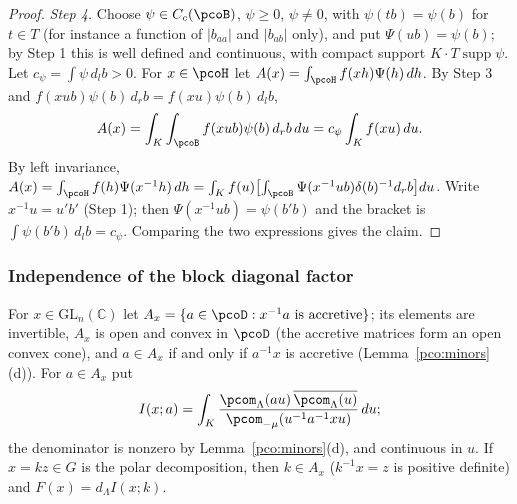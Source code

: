 \documentclass[10pt]{amsart}
\theoremstyle{definition}
\theoremstyle{remark}
\newcommand{\C}{\mathbb C}
\begin{document}
\begin{proof}
\emph{Step 4.} Choose $\psi\in C_c(\pcoB)$, $\psi\ge0$, $\psi\ne0$, with $\psi(tb)=\psi(b)$ for $t\in T$
(for instance a function of $|b_{aa}|$ and $|b_{ab}|$ only), and put $\Psi(ub)=\psi(b)$; by Step 1
this is well defined and continuous, with compact support $K\cdot T\operatorname{supp}\psi$. Let
$c_\psi=\int\psi\,d_lb>0$. For $x\in\pcoH$ let $A(x)=\int_{\pcoH}f(xh)\Psi(h)\,dh$. By Step 3 and
$f(xub)\psi(b)\,d_rb=f(xu)\psi(b)\,d_lb$,
\[
A(x)=\int_K\int_{\pcoB}f(xub)\psi(b)\,d_rb\,du=c_\psi\int_Kf(xu)\,du .
\]
By left invariance, $A(x)=\int_{\pcoH}f(h)\Psi(x^{-1}h)\,dh=\int_Kf(u)\bigl[\int_{\pcoB}\Psi(x^{-1}ub)
\delta(b)^{-1}d_rb\bigr]du$. Write $x^{-1}u=u'b'$ (Step 1); then $\Psi(x^{-1}ub)=\psi(b'b)$ and the
bracket is $\int\psi(b'b)\,d_lb=c_\psi$. Comparing the two expressions gives the claim.
\end{proof}

\subsubsection{Independence of the block diagonal factor}\label{pco:ss-indep}
For $x\in\mathrm{GL}_n(\C)$ let $A_x=\{a\in\pcoD:x^{-1}a\text{ is accretive}\}$; its elements are
invertible, $A_x$ is open and convex in $\pcoD$ (the accretive matrices form an open convex cone),
and $a\in A_x$ if and only if $a^{-1}x$ is accretive (Lemma~\ref{pco:minors}(d)). For $a\in A_x$ put
\begin{equation}\label{pco:eq-I}
I(x;a)=\int_K\frac{\pcom_\Lambda(au)\,\overline{\pcom_\Lambda(u)}}{\pcom_{-\mu}(u^{-1}a^{-1}xu)}\,du ;
\end{equation}
the denominator is nonzero by Lemma~\ref{pco:minors}(d), and continuous in $u$. If $x=kz\in G$ is
the polar decomposition, then $k\in A_x$ ($k^{-1}x=z$ is positive definite) and
$F(x)=d_\Lambda I(x;k)$.
\end{document}
